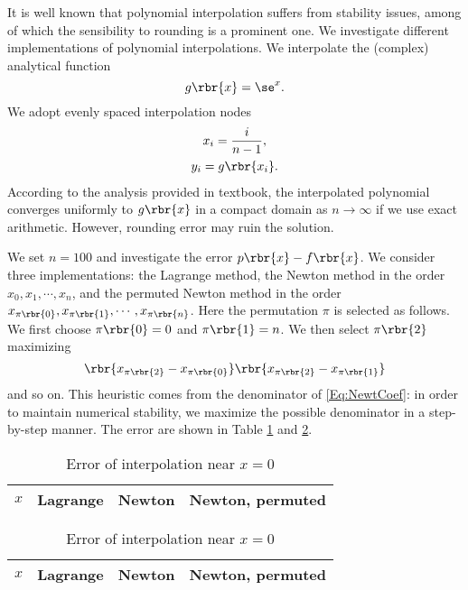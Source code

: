 \documentclass[english, nochinese]{pnote}
\begin{document}
It is well known that polynomial interpolation suffers from stability issues, among of which the sensibility to rounding is a prominent one. We investigate different implementations of polynomial interpolations. We interpolate the (complex) analytical function
\begin{equation}
g \rbr{x} = \se^x.
\end{equation}
We adopt evenly spaced interpolation nodes
\begin{gather}
x_i = \frac{i}{ n - 1 }, \\
y_i = g \rbr{x_i}.
\end{gather}
According to the analysis provided in textbook, the interpolated polynomial converges uniformly to $ g \rbr{x} $ in a compact domain as $ n \rightarrow \infty $ if we use exact arithmetic. However, rounding error may ruin the solution.

We set $ n = 100 $ and investigate the error $ p \rbr{x} - f \rbr{x} $. We consider three implementations: the Lagrange method, the Newton method in the order $ x_0, x_1, \cdots, x_n $, and the permuted Newton method in the order $ x_{ \pi \rbr{0} }, x_{ \pi \rbr{1} }, \cdots, x_{ \pi \rbr{n} } $. Here the permutation $\pi$ is selected as follows. We first choose $ \pi \rbr{0} = 0 $ and $ \pi \rbr{1} = n $. We then select $ \pi \rbr{2} $ maximizing
\begin{equation}
\rbr{ x_{ \pi \rbr{2} } - x_{ \pi \rbr{0} } } \rbr{ x_{ \pi \rbr{2} } - x_{ \pi \rbr{1} } }
\end{equation}
and so on. This heuristic comes from the denominator of \eqref{Eq:NewtCoef}: in order to maintain numerical stability, we maximize the possible denominator in a step-by-step manner. The error are shown in Table \ref{Tbl:ExpAt0} and \ref{Tbl:ExpAt1}.

\begin{table}
\centering
\begin{tabular}{|c|c|c|c|}
\hline
$x$ & Lagrange & Newton & Newton, permuted \\
\hline

\end{tabular}
\caption{Error of interpolation near $ x = 0 $}
\label{Tbl:ExpAt0}
\end{table}

\begin{table}
\centering
\begin{tabular}{|c|c|c|c|}
\hline
$x$ & Lagrange & Newton & Newton, permuted \\
\hline

\end{tabular}
\caption{Error of interpolation near $ x = 0 $}
\label{Tbl:ExpAt1}
\end{table}
\end{document}
